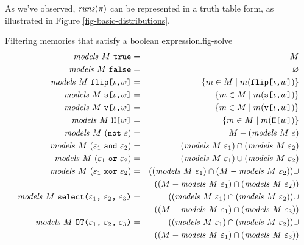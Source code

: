 
As we've observed, $\mathit{runs}(\pi)$ can be represented in a truth table
form, as illustrated in Figure \ref{fig-basic-distributions}. 

\begin{fpfig}[t]{Filtering memories that satisfy a boolean expression.}{fig-solve}
\begin{eqnarray*}
\mathit{models}\ M\ \texttt{true} &=& M\\
\mathit{models}\ M\ \texttt{false} &=& \varnothing\\
\mathit{models}\ M\ \texttt{flip[}\iota\texttt{,}w\texttt{]} &=& \{ m \in M \mid m(\texttt{flip[}\iota\texttt{,}w\texttt{]}) \} \\
\mathit{models}\ M\ \texttt{s[}\iota\texttt{,}w\texttt{]} &=& \{ m \in M \mid m(\texttt{s[}\iota\texttt{,}w\texttt{]}) \} \\
\mathit{models}\ M\ \texttt{v[}\iota\texttt{,}w\texttt{]} &=& \{ m \in M \mid m(\texttt{v[}\iota\texttt{,}w\texttt{]}) \} \\
\mathit{models}\ M\ \texttt{H[}w\texttt{]} &=& \{ m \in M \mid m(\texttt{H[}w\texttt{]}) \} \\
\mathit{models}\ M\ (\texttt{not}\ \varepsilon) &=& M - (\mathit{models}\ M\ \varepsilon)\\
\mathit{models}\ M\ (\varepsilon_1\ \texttt{and}\ \varepsilon_2) &=& (\mathit{models}\ M\ \varepsilon_1) \cap (\mathit{models}\ M\ \varepsilon_2) \\
\mathit{models}\ M\ (\varepsilon_1\ \texttt{or}\ \varepsilon_2) &=& (\mathit{models}\ M\ \varepsilon_1) \cup (\mathit{models}\ M\ \varepsilon_2) \\
\mathit{models}\ M\ (\varepsilon_1\ \texttt{xor}\ \varepsilon_2) &=&
 ((\mathit{models}\ M\ \varepsilon_1) \cap (M - \mathit{models}\ M\ \varepsilon_2)) \cup\\
 && ((M - \mathit{models}\ M\ \varepsilon_1) \cap (\mathit{models}\ M\ \varepsilon_2)) \\
\mathit{models}\ M\ \texttt{select(} \varepsilon_1 \texttt{,}\ \varepsilon_2 \texttt{,}\ \varepsilon_3 \texttt{)} &=&
 ((\mathit{models}\ M\ \varepsilon_1) \cap (\mathit{models}\ M\ \varepsilon_2)) \cup \\
 && ((M - \mathit{models}\ M\ \varepsilon_1) \cap (\mathit{models}\ M\ \varepsilon_3)) \\
\mathit{models}\ M\ \texttt{OT(} \varepsilon_1 \texttt{,}\ \varepsilon_2 \texttt{,}\ \varepsilon_3 \texttt{)} &=&
 ((\mathit{models}\ M\ \varepsilon_1) \cap (\mathit{models}\ M\ \varepsilon_2)) \cup\\
 && ((M - \mathit{models}\ M\ \varepsilon_1) \cap (\mathit{models}\ M\ \varepsilon_3))
\end{eqnarray*}
\end{fpfig}

